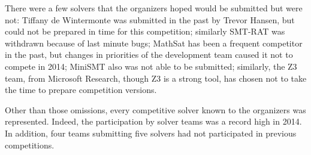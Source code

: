\documentclass[twoside,11pt]{article}
\begin{document}
There were a few solvers that the organizers hoped would be submitted but were not: Tiffany de Wintermonte was submitted in the past by Trevor Hansen, but could not be prepared in time for this competition; similarly SMT-RAT was withdrawn because of last minute bugs; MathSat has been a frequent competitor in the past, but changes in priorities of the development team caused it not to compete in 2014; MiniSMT also was not able to be submitted; similarly, the Z3 team, from Microsoft Research, though Z3 is a strong tool, has chosen not to take the time to prepare competition versions.

Other than those omissions, every competitive solver known to the organizers was represented. Indeed, the participation by solver teams was a record high in 2014. In addition, four teams submitting five solvers had not participated in previous competitions.
\end{document}
